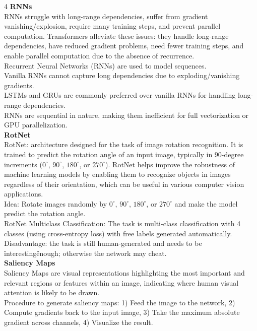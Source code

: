 \documentclass[8pt]{extarticle}
\begin{document}
\begin{multicols}{4}
{\vspace{2pt}\textbf{RNNs}\\
RNNs struggle with long-range dependencies, suffer from gradient vanishing/explosion, require many training steps, and prevent parallel computation. Transformers alleviate these issues: they handle long-range dependencies, have reduced gradient problems, need fewer training steps, and enable parallel computation due to the absence of recurrence.\\
Recurrent Neural Networks (RNNs) are used to model sequences.\\
Vanilla RNNs cannot capture long dependencies due to exploding/vanishing gradients.\\
LSTMs and GRUs are commonly preferred over vanilla RNNs for handling long-range dependencies.\\
RNNs are sequential in nature, making them inefficient for full vectorization or GPU parallelization.\\
\vspace{2pt}\textbf{RotNet}\\
RotNet: architecture designed for the task of image rotation recognition. It is trained to predict the rotation angle of an input image, typically in $90$-degree increments ($0^\circ$, $90^\circ$, $180^\circ$, or $270^\circ$). RotNet helps improve the robustness of machine learning models by enabling them to recognize objects in images regardless of their orientation, which can be useful in various computer vision applications.\\
Idea: Rotate images randomly by $0^\circ$, $90^\circ$, $180^\circ$, or $270^\circ$ and make the model predict the rotation angle.\\
RotNet Multiclass Classification: The task is multi-class classification with 4 classes (using cross-entropy loss) with free labels generated automatically. Disadvantage: the task is still human-generated and needs to be \"interesting\" enough; otherwise the network may cheat.\\
\vspace{2pt}\textbf{Saliency Maps}\\
Saliency Maps are visual representations highlighting the most important and relevant regions or features within an image, indicating where human visual attention is likely to be drawn.\\
Procedure to generate saliency maps: 1) Feed the image to the network, 2) Compute gradients back to the input image, 3) Take the maximum absolute gradient across channels, 4) Visualize the result.\\
}
\end{multicols}
\end{document}
